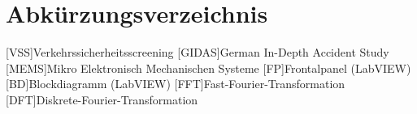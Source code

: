 \chapter*{Abkürzungsverzeichnis}

\begin{acronym}[BreiteDerLinkenSpalte]
[VSS]{Verkehrssicherheitsscreening}
[GIDAS]{German In-Depth Accident Study}
[MEMS]{Mikro Elektronisch Mechanischen Systeme}
[FP]{Frontalpanel (LabVIEW)}
[BD]{Blockdiagramm (LabVIEW)}
[FFT]{Fast-Fourier-Transformation}
[DFT]{Diskrete-Fourier-Transformation}

\end{acronym}





